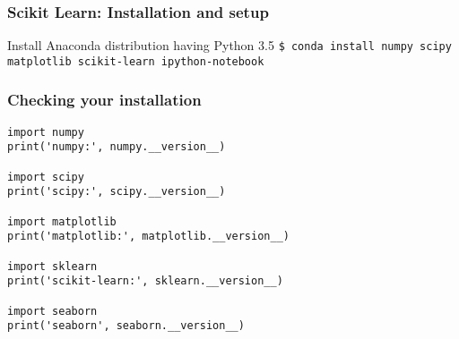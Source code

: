 \begin{frame}[fragile]\frametitle{Scikit Learn:  Installation and setup}
Install Anaconda distribution having Python 3.5
\lstinline|$ conda install numpy scipy matplotlib scikit-learn ipython-notebook|
\end{frame}

\begin{frame}[fragile]\frametitle{Checking your installation}
\begin{lstlisting}
import numpy
print('numpy:', numpy.__version__)

import scipy
print('scipy:', scipy.__version__)

import matplotlib
print('matplotlib:', matplotlib.__version__)

import sklearn
print('scikit-learn:', sklearn.__version__)

import seaborn
print('seaborn', seaborn.__version__)
\end{lstlisting}
\end{frame}

